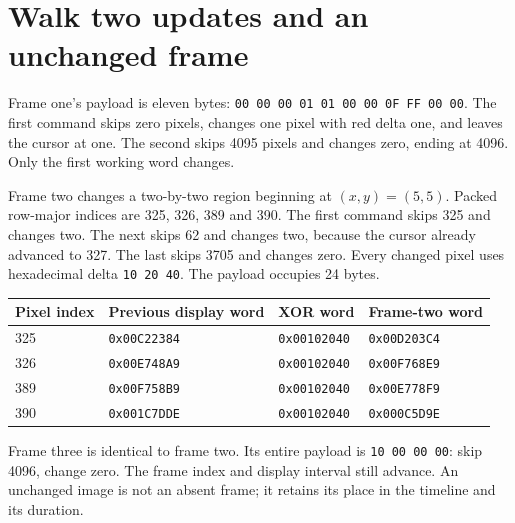 \section{Walk two updates and an unchanged frame}
Frame one's payload is eleven bytes:
\texttt{00 00 00 01 01 00 00 0F FF 00 00}. The first command skips zero pixels,
changes one pixel with red delta one, and leaves the cursor at one. The second skips
4095 pixels and changes zero, ending at 4096. Only the first working word changes.

Frame two changes a two-by-two region beginning at $(x,y)=(5,5)$. Packed row-major
indices are 325, 326, 389 and 390. The first command skips 325 and changes two. The
next skips 62 and changes two, because the cursor already advanced to 327. The last
skips 3705 and changes zero. Every changed pixel uses hexadecimal delta
\texttt{10 20 40}. The payload occupies 24 bytes.
\begin{longtable}{p{19mm}p{42mm}p{34mm}p{42mm}}
  \toprule Pixel index & Previous display word & XOR word            & Frame-two word      \\\midrule
  325                  & \texttt{0x00C22384}   & \texttt{0x00102040} & \texttt{0x00D203C4} \\
  326                  & \texttt{0x00E748A9}   & \texttt{0x00102040} & \texttt{0x00F768E9} \\
  389                  & \texttt{0x00F758B9}   & \texttt{0x00102040} & \texttt{0x00E778F9} \\
  390                  & \texttt{0x001C7DDE}   & \texttt{0x00102040} & \texttt{0x000C5D9E} \\\bottomrule
\end{longtable}
Frame three is identical to frame two. Its entire payload is
\texttt{10 00 00 00}: skip 4096, change zero. The frame index and display interval
still advance. An unchanged image is not an absent frame; it retains its place in
the timeline and its duration.
